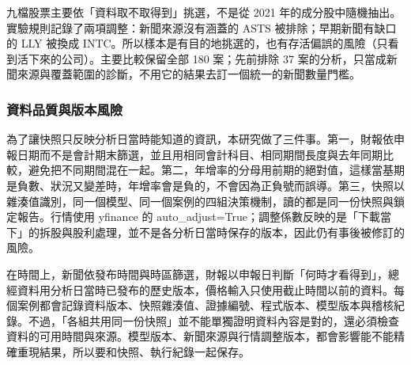 九檔股票主要依「資料取不取得到」挑選，不是從 2021 年的成分股中隨機抽出。實驗規則記錄了兩項調整：新聞來源沒有涵蓋的 ASTS 被排除；早期新聞有缺口的 LLY 被換成 INTC。所以樣本是有目的地挑選的，也有存活偏誤的風險（只看到活下來的公司）。主要比較保留全部 180 案；先前排除 37 案的分析，只當成新聞來源與覆蓋範圍的診斷，不用它的結果去訂一個統一的新聞數量門檻。

\subsubsection{資料品質與版本風險}
為了讓快照只反映分析日當時能知道的資訊，本研究做了三件事。第一，財報依申報日期而不是會計期末篩選，並且用相同會計科目、相同期間長度與去年同期比較，避免把不同期間混在一起。第二，年增率的分母用前期的絕對值，這樣當基期是負數、狀況又變差時，年增率會是負的，不會因為正負號而誤導。第三，快照以雜湊值識別，同一個模型、同一個案例的四組決策機制，讀的都是同一份快照與鎖定報告。行情使用 yfinance 的 auto\_adjust=True；調整係數反映的是「下載當下」的拆股與股利處理，並不是各分析日當時保存的版本，因此仍有事後被修訂的風險。

在時間上，新聞依發布時間與時區篩選，財報以申報日判斷「何時才看得到」，總經資料用分析日當時已發布的歷史版本，價格輸入只使用截止時間以前的資料。每個案例都會記錄資料版本、快照雜湊值、證據編號、程式版本、模型版本與稽核紀錄。不過，「各組共用同一份快照」並不能單獨證明資料內容是對的，還必須檢查資料的可用時間與來源。模型版本、新聞來源與行情調整版本，都會影響能不能精確重現結果，所以要和快照、執行紀錄一起保存。

